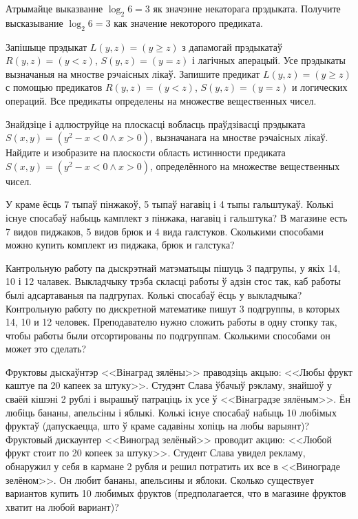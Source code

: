 \documentclass[12pt, a4paper]{article}
\begin{document}
\begin{problemList}

\problemItemSimple
{Атрымайце выказванне $\log_{2}{6} = 3$ як значэнне некаторага прэдыката.}
{Получите высказывание $\log_{2}{6} = 3$ как значение некоторого предиката.}

\bigskip

\problemItemSimple
{Запішыце прэдыкат $L(y, z) = (y \ge z)$ з дапамогай прэдыкатаў $R(y, z) = (y < z)$, $S(y, z) = (y =z)$ і лагічных аперацый.
Усе прэдыкаты вызначаныя на мностве рэчаісных лікаў.}
{Запишите предикат $L(y, z) = (y \ge z)$ с помощью предикатов $R(y, z) = (y < z)$, $S(y, z) = (y =z)$ и логических операций.
Все предикаты определены на множестве вещественных чисел.}

\bigskip

\problemItemSimple
{Знайдзіце і адлюструйце на плоскасці вобласць праўдзівасці прэдыката $S(x, y) = (y^2-x < 0 \wedge x > 0)$, вызначанага на мностве рэчаісных лікаў.}
{Найдите и изобразите на плоскости область истинности предиката $S(x, y) = (y^2-x < 0 \wedge x > 0)$, определённого на множестве вещественных чисел.}

\bigskip

\problemItemSimple
{У краме ёсць 7 тыпаў пінжакоў, 5 тыпаў нагавіц і 4 тыпы гальштукаў.
Колькі існуе спосабаў набыць камплект з пінжака, нагавіц і гальштука?}
{В магазине есть 7 видов пиджаков, 5 видов брюк и 4 вида галстуков.
Сколькими способами можно купить комплект из пиджака, брюк и галстука?}

\bigskip

\problemItemSimple
{Кантрольную работу па дыскрэтнай матэматыцы пішуць 3 падгрупы, у якіх 14, 10 і 12 чалавек.
Выкладчыку трэба скласці работы ў адзін стос так, каб работы былі адсартаваныя па падгрупах.
Колькі спосабаў ёсць у выкладчыка?}
{Контрольную работу по дискретной математике пишут 3 подгруппы, в которых 14, 10 и 12 человек.
Преподавателю нужно сложить работы в одну стопку так, чтобы работы были отсортированы по подгруппам.
Сколькими способами он может это сделать?}

\bigskip

\problemItemSimple
{Фруктовы дыскаўнтэр <<Вінаград зялёны>> праводзіць акцыю: <<Любы фрукт каштуе па 20 капеек за штуку>>.
Студэнт Слава ўбачыў рэкламу, знайшоў у сваёй кішэні 2 рублі і вырашыў патраціць іх усе ў <<Вінаградзе зялёным>>.
Ён любіць бананы, апельсіны і яблыкі. Колькі існуе спосабаў набыць 10 любімых фруктаў
(дапускаецца, што ў краме садавіны хопіць на любы варыянт)?}
{Фруктовый дискаунтер <<Виноград зелёный>> проводит акцию: <<Любой фрукт стоит по 20 копеек за штуку>>.
Студент Слава увидел рекламу, обнаружил у себя в кармане 2 рубля и решил потратить их все в <<Винограде зелёном>>.
Он любит бананы, апельсины и яблоки. Сколько существует вариантов купить 10 любимых фруктов
(предполагается, что в магазине фруктов хватит на любой вариант)?}


\end{problemList}
\end{document}
